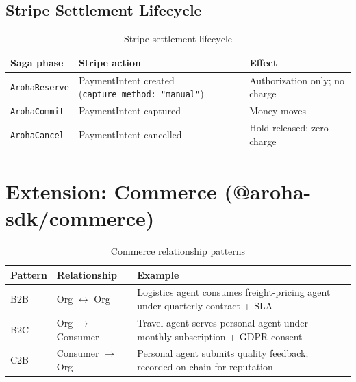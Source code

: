 \documentclass[11pt,a4paper]{article}
\begin{document}
\subsection{Stripe Settlement Lifecycle}

\begin{table}[ht]
  \centering
  \renewcommand{\arraystretch}{1.3}
  \begin{tabularx}{\textwidth}{@{} l l X @{}}
    \toprule
    \textbf{Saga phase} & \textbf{Stripe action} & \textbf{Effect} \\
    \midrule
    \texttt{ArohaReserve} & PaymentIntent created (\texttt{capture\_method: "manual"}) & Authorization only; no charge \\
    \texttt{ArohaCommit}  & PaymentIntent captured                                     & Money moves \\
    \texttt{ArohaCancel}  & PaymentIntent cancelled                                    & Hold released; zero charge \\
    \bottomrule
  \end{tabularx}
  \caption{Stripe settlement lifecycle}
\end{table}

\section{Extension: Commerce (@aroha-sdk/commerce)}

\begin{table}[ht]
  \centering
  \renewcommand{\arraystretch}{1.4}
  \begin{tabularx}{\textwidth}{@{} l l X @{}}
    \toprule
    \textbf{Pattern} & \textbf{Relationship} & \textbf{Example} \\
    \midrule
    B2B & Org $\leftrightarrow$ Org
      & Logistics agent consumes freight-pricing agent under quarterly contract + SLA \\
    B2C & Org $\to$ Consumer
      & Travel agent serves personal agent under monthly subscription + GDPR consent \\
    C2B & Consumer $\to$ Org
      & Personal agent submits quality feedback; recorded on-chain for reputation \\
    \bottomrule
  \end{tabularx}
  \caption{Commerce relationship patterns}
\end{table}
\end{document}
